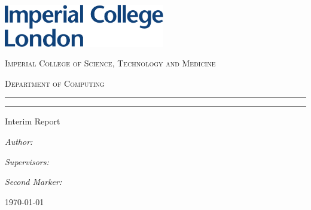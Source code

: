 \begin{titlepage}
	
	\noindent\includegraphics[width=7cm]{./figures/imperial}
	
	\Large\centering
	
	\vspace*{3\baselineskip}	
	\textsc{\LARGE \reporttype}
	
	\vspace*{\baselineskip}	
	\textsc{Imperial College of Science, Technology and Medicine}

	\vspace*{\baselineskip}	
	\textsc{Department of Computing}


	\setlength{\parindent}{0pt}
	
	\setlength{\parskip}{0pt}

	\rule{\linewidth}{0.4pt}\vspace*{\baselineskip}

	{\huge\bfseries\reporttitle}
	\rule{\linewidth}{0.4pt}

	Interim Report

	\begin{multicols}{2}
		\begin{flushleft}
			\emph{Author:}
			
			\reportauthor
		\end{flushleft}
		\columnbreak
		\begin{flushright}
			\emph{Supervisors:}
			
			\supervisor	
			\linespace
			\emph{Second Marker:}
			
			\marker
		\end{flushright}			
	\end{multicols}
	
	
	\monthyeardate\today
	
	
\end{titlepage}
